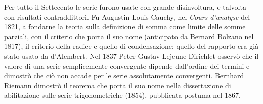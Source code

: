 \begin{notastorica}
Per tutto il Settecento le serie furono usate con grande disinvoltura, e talvolta con
risultati contraddittori. Fu Augustin-Louis Cauchy, nel \emph{Cours d'analyse} del 1821, a
fondarne la teoria sulla definizione di somma come limite delle somme parziali, con il
criterio che porta il suo nome (anticipato da Bernard Bolzano nel 1817), il criterio
della radice e quello di condensazione; quello del rapporto era già stato usato da d'Alembert. Nel 1837 Peter
Gustav Lejeune Dirichlet osservò che il valore di una serie semplicemente convergente
dipende dall'ordine dei termini e dimostrò che ciò non accade per le serie
assolutamente convergenti. Bernhard Riemann dimostrò il teorema che porta il suo nome nella
dissertazione di abilitazione sulle serie trigonometriche (1854), pubblicata postuma nel
1867.
\end{notastorica}
